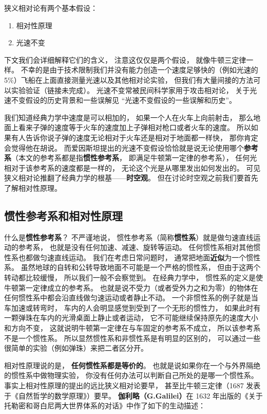 

狭义相对论有两个基本假设：
\begin{enumerate}
\item 相对性原理
\item 光速不变
\end{enumerate}
下文我们会详细解释它们的含义， 注意这仅仅是两个假设， 就像牛顿三定律一样。 不幸的是由于技术限制我们并没有能力创造一个速度足够快的（例如光速的 5\%）飞船在上面直接测量光速以及其他相对论实验， 但我们有大量间接的方法可以实验验证（链接未完成）。 光速不变常被民间科学家用于攻击相对论， 关于光速不变假设的历史背景和一些误解见 “光速不变假设的一些误解和历史”。

我们知道经典力学中速度是可以相加的， 如果一个人在火车上向前射击， 那么地面上看来子弹的速度等于火车的速度加上子弹相对枪口或者火车的速度。 所以如果有人告诉你说子弹的速度无论相对于火车还是相对于地面都一样快， 那你肯定会觉得他在胡说。 而爱因斯坦提出的光速不变假设恰恰就是说无论使用哪个\textbf{参考系}（本文的参考系都是指\textbf{惯性参考系}， 即满足牛顿第一定律的参考系）， 任何光相对于该参考系的速度都是一样的， 无论这个光是从哪里发出如何发出的。 可见狭义相对论推翻了经典力学的根基——\textbf{时空观}。 但在讨论时空观之前我们要首先了解相对性原理。

\subsection{惯性参考系和相对性原理}
什么是\textbf{惯性参考系}？ 不严谨地说， 惯性参考系（简称\textbf{惯性系}）就是做匀速直线运动的参考系， 也就是没有任何加速、减速、旋转等运动。 任何惯性系相对其他惯性系也都做匀速直线运动。 我们在考虑日常问题时， 通常把地面\textbf{近似}为一个惯性系。 虽然地球的自转和公转导致地面不可能是一个严格的惯性系， 但由于这两个转动都比较缓慢， 所以我们一般不会察觉到。 在经典力学中， 惯性系的定义是使牛顿第一定律成立的参考系。 也就是说不受力（或者受外力之和为零）的物体在任何惯性系中都会沿直线做匀速运动或者静止不动。 一个非惯性系的例子就是当车加速或转弯时， 车内的人会明显感觉到受到了一个无形的惯性力， 如果此时有一颗弹珠在车内的光滑桌面上静止或者运动， 它不可能继续保持原先的速度大小和方向不变， 这就说明牛顿第一定律在与车固定的参考系不成立， 所以该参考系不是一个惯性系。 所以显然惯性系和非惯性系是有明显的区别的， 可以通过一些很简单的实验（例如弹珠）来把二者区分开。

相对性原理说的是， \textbf{任何惯性系都是等价的}。 也就是说如果你在一个与外界隔绝的惯性系中做物理实验， 你没有任何办法可以判断自己所处的是哪一个惯性系。 事实上相对性原理的提出的远比狭义相对论要早， 甚至比牛顿三定律（1687 发表于《自然哲学的数学原理》）要早。 \textbf{伽利略（G.Galilei）}在 1632 年出版的《关于托勒密和哥白尼两大世界体系的对话》中作了如下的生动描述：

